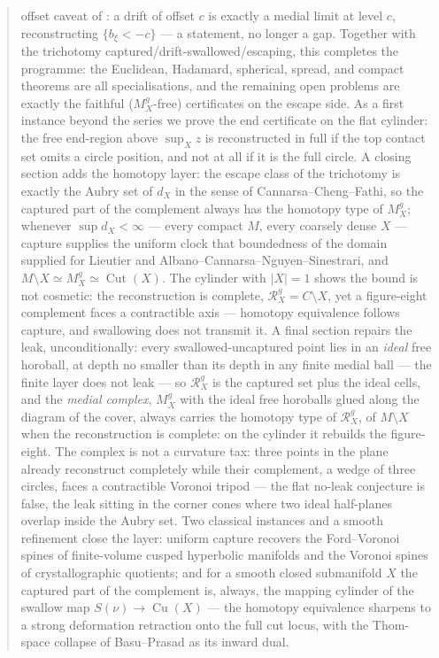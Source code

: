 \documentclass[11pt]{article}
\theoremstyle{remark}
\newcommand{\X}{X}
\newcommand{\Mg}{M^{g}_{\X}}
\newcommand{\Rg}{\mathcal{R}^{g}_{\X}}
\newcommand{\dX}{d_{\X}}
\newcommand{\Cut}{\operatorname{Cut}}
\newcommand{\Cu}{\operatorname{Cu}}
\begin{document}
\begin{abstract}
offset caveat of \cite{R3}: a drift of offset $c$ is exactly a medial
limit at level $c$, reconstructing $\{b_{\xi}<-c\}$ --- a statement,
no longer a gap. Together with the trichotomy
captured/drift-swallowed/escaping, this completes the programme: the
Euclidean, Hadamard, spherical, spread, and compact theorems are all
specialisations, and the remaining open problems are exactly the
faithful ($\Mg$-free) certificates on the escape side. As a first
instance beyond the series we prove the end certificate on the flat
cylinder: the free end-region above $\sup_{\X}z$ is reconstructed in
full if the top contact set omits a circle position, and not at all
if it is the full circle. A closing section adds the homotopy layer:
the escape class of the trichotomy is exactly the Aubry set of
$\dX$ in the sense of Cannarsa--Cheng--Fathi, so the captured part of
the complement always has the homotopy type of $\Mg$; whenever
$\sup\dX<\infty$ --- every compact $M$, every coarsely dense $\X$ ---
capture supplies the uniform clock that boundedness of the domain
supplied for Lieutier and Albano--Cannarsa--Nguyen--Sinestrari, and
$M\setminus\X\simeq\Mg\simeq\Cut(\X)$. The cylinder with $|\X|=1$
shows the bound is not cosmetic: the reconstruction is complete,
$\Rg=C\setminus\X$, yet a figure-eight complement faces a
contractible axis --- homotopy equivalence follows capture, and
swallowing does not transmit it. A final section repairs the leak,
unconditionally: every swallowed-uncaptured point lies in an
\emph{ideal} free horoball, at depth no smaller than its depth in
any finite medial ball --- the finite layer does not leak --- so
$\Rg$ is the captured set plus the ideal cells, and the
\emph{medial complex}, $\Mg$ with the ideal free horoballs glued
along the diagram of the cover, always carries the homotopy type
of $\Rg$, of $M\setminus\X$ when the reconstruction is complete:
on the cylinder it rebuilds the figure-eight. The complex is not a
curvature tax: three points in the plane already reconstruct
completely while their complement, a wedge of three circles, faces
a contractible Voronoi tripod --- the flat no-leak conjecture is
false, the leak sitting in the corner cones where two ideal
half-planes overlap inside the Aubry set. Two classical
instances and a smooth refinement close the layer: uniform capture
recovers the
Ford--Voronoi spines of finite-volume cusped hyperbolic manifolds
and the Voronoi spines of crystallographic quotients; and for a
smooth closed submanifold $\X$ the captured part of the complement
is, always, the mapping cylinder of the swallow map
$S(\nu)\to\Cu(\X)$ --- the homotopy equivalence sharpens to a
strong deformation retraction onto the full cut locus, with the
Thom-space collapse of Basu--Prasad as its inward dual.
\end{abstract}
\end{document}
